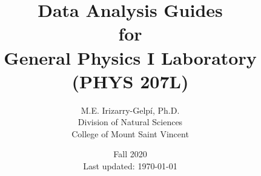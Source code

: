 \documentclass[letterpaper,12pt]{report}
\begin{document}
%
\title{\Huge{Data Analysis Guides \\ for \\ General Physics I Laboratory \\ (PHYS 207L)}}
\author{M.E. Irizarry-Gelp\'{i}, Ph.D. \\ Division of Natural Sciences \\ College of Mount Saint Vincent}
\date{Fall 2020 \\ Last updated: \today{ }\currenttime}
%
\maketitle
\tableofcontents
%
% 
%
%
% 
% 
%
%
% 
% 
% 
%
%
% 
%
%
% 
% 
%
%
% 
% 
%
\appendix
%

% 
% 
%
\end{document}
